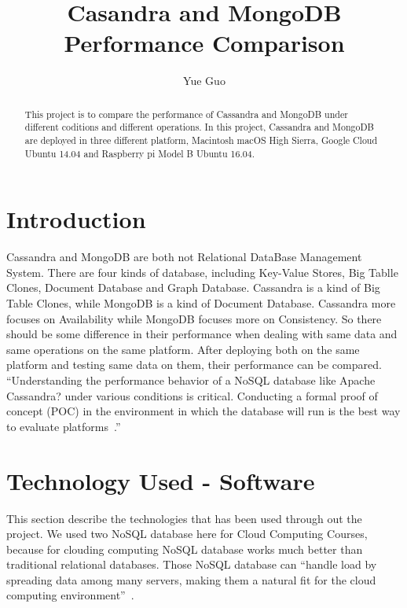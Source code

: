 
\title{Casandra and MongoDB Performance Comparison}

\author{Yue Guo}

\begin{abstract}
This project is to compare the performance of Cassandra and MongoDB 
under different coditions and different operations. In this project, Cassandra
 and MongoDB are deployed in three different platform, Macintosh macOS 
 High Sierra, Google Cloud Ubuntu 14.04 and Raspberry pi Model B Ubuntu 
 16.04.
\end{abstract}



\maketitle


\section{Introduction}
Cassandra and MongoDB are both not Relational DataBase Management System. 
There are four kinds of database, including Key-Value Stores, Big Tablle 
Clones, Document Database and Graph Database. Cassandra is a kind of Big 
Table Clones, while MongoDB is a kind of Document Database. Cassandra more 
focuses on Availability while MongoDB focuses more on Consistency. So there
 should be some difference in their performance when dealing with same data 
 and same operations on the same platform. After deploying both on the same 
 platform and testing same data on them, their performance can be compared. 
 ``Understanding the performance behavior of a NoSQL database like Apache 
 Cassandra? under various conditions is critical. Conducting a formal proof 
 of concept (POC) in the environment in which the database will run is the 
 best way to evaluate platforms~\cite{hid-sp18-508-benchmarking}.''

\section{Technology Used - Software}
This section describe the technologies that has been used through out 
the project.
We used two NoSQL database here for Cloud Computing Courses, 
because for clouding computing NoSQL database works much better
than traditional relational databases. Those NoSQL database can ``handle load
by spreading data among many servers, making them a natural fit for the 
cloud computing environment''~\cite{hid-sp18-508-nosql}.


